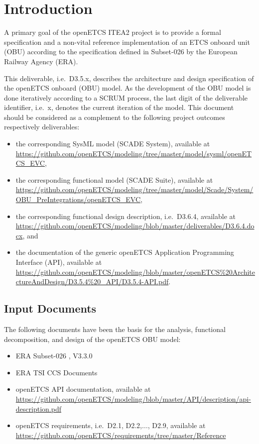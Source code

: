 
\chapter{Introduction}

A primary goal of the openETCS ITEA2 project is to provide a formal specification and a non-vital reference implementation of an ETCS onboard unit (OBU) according to the specification defined in Subset-026 \cite{subset-026} by the European Railway Agency (ERA). 

This deliverable, i.e.~D3.5.x, describes the architecture and design specification of the openETCS onboard (OBU) model. As the development of the OBU model is done iteratively according to a SCRUM process, the last digit of the deliverable identifier, i.e.~x, denotes the current iteration of the model. This document should be considered as a complement to the following project outcomes respectively deliverables:
\begin{itemize}
\item the corresponding SysML model (SCADE System), available at \url{https://github.com/openETCS/modeling/tree/master/model/sysml/openETCS_EVC},
\item the corresponding functional model (SCADE Suite), available at \url{https://github.com/openETCS/modeling/tree/master/model/Scade/System/OBU_PreIntegrations/openETCS_EVC},
\item the corresponding functional design description, i.e.~D3.6.4, available at \url{https://github.com/openETCS/modeling/blob/master/deliverables/D3.6.4.docx}, and
\item the documentation of the generic openETCS Application Programming Interface (API), available at \url{https://github.com/openETCS/modeling/blob/master/openETCS%20ArchitectureAndDesign/D3.5.4%20_API/D3.5.4-API.pdf}.
\end{itemize}


\section{Input Documents}

The following documents have been the basis for the analysis, functional decomposition, and design of the openETCS OBU model:
\begin{itemize}
\item ERA Subset-026 \cite{subset-026}, V3.3.0
\item ERA TSI CCS Documents
\item openETCS API documentation, available at \url{https://github.com/openETCS/modeling/blob/master/API/description/api-description.pdf}
\item openETCS requirements, i.e.~D2.1, D2.2,$\ldots$, D2.9, available at \url{https://github.com/openETCS/requirements/tree/master/Reference}
\end{itemize}


